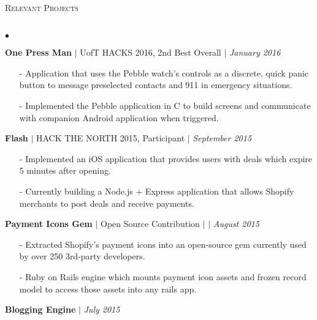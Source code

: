 \documentclass[10pt]{article}
\newcommand{\lineunder}{\vspace*{-8pt} \\ \hspace*{-18pt} \hrulefill \\}
\newcommand{\header}[1]{{\hspace*{-15pt}\vspace*{6pt} \textsc{#1}} \vspace*{-6pt} \lineunder }
\newenvironment{achievements}{\begin{list}{$\bullet$}{\topsep 0pt \itemsep -1.5pt \leftmargin 5pt}}{\vspace*{4pt}\end{list}}
\begin{document}
\vspace{8pt}

\header{\fontsize{11}{12}\selectfont Relevant Projects}
\begin{achievements}
\def\UrlFont{\em}
\item \textbf{One Press Man} {$|$ \scriptsize UofT HACKS 2016, 2nd Best Overall} $|$  \href{https://github.com/adrianmachado/Onepressman}{\faGithub} \hfill \textit {January 2016}
\begin{itemize}
\item[-]Application that uses the Pebble watch's controls as a discrete, quick panic button to message preselected contacts and 911 in emergency situations.
\vspace{2pt}
\item[-]Implemented the Pebble application in C to build screens and communicate with companion Android application when triggered.
\end{itemize}
\vspace{2pt}
\def\UrlFont{\em}
\item \textbf{Flash} {$|$ \scriptsize HACK THE NORTH 2015, Participant} $|$  \href{https://github.com/nakulpathak3/Flash}{\faGithub} \hfill \textit {September 2015}
\begin{itemize}
\item[-]Implemented an iOS application that provides users with deals which expire 5 minutes after opening.
\vspace{2pt}
\item[-]Currently building a Node.js + Express application that allows Shopify merchants to post deals and receive payments.
\end{itemize}
\vspace{2pt}
\item \textbf{Payment Icons Gem} {$|$ \scriptsize Open Source Contribution} $|$  \href{https://github.com/activemerchant/payment_icons}{\faGithub} $|$ \href{https://rubygems.org/gems/payment_icons/versions/0.0.1}{\faExternalLink} \hfill \textit {August 2015}
\begin{itemize}
\item[-]Extracted Shopify's payment icons into an open-source gem currently used by over 250 3rd-party developers.
\vspace{2pt}
\item[-]Ruby on Rails engine which mounts payment icon assets and frozen record model to access those assets into any rails app.
\end{itemize}
\item \textbf{Blogging Engine}  $|$  \href{https://github.com/nakulpathak3/blorgh-engine-gem}{\faGithub} \hfill \textit {July 2015}

\end{achievements}
\end{document}
